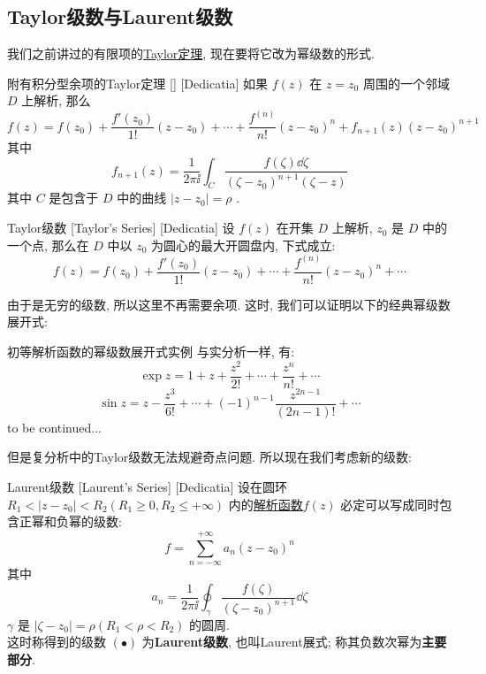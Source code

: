 \documentclass[UTF8]{ctexart}
\newcommand{\continued}{{\Large to be continued...}}
\newcommand{\AnalyticalFunction}{\hyperref[dfn:AnalyticalFunction]{解析函数}}
\newcommand{\TaylorThm}{\hyperref[thm:Taylor]{Taylor定理}}
\begin{document}
\subsection{Taylor级数与Laurent级数}
我们之前讲过的有限项的\TaylorThm , 现在要将它改为幂级数的形式. 
\begin{thm}
    [UUID]
    {附有积分型余项的Taylor定理}
    []
    [Dedicatia]
    如果 \( f(z) \) 在 \( z=z_0 \) 周围的一个邻域 \( D \) 上解析, 那么
    \[f(z)=f(z_0)+\frac{f'(z_0)}{1!}(z-z_0)+\cdots+\frac{f^{(n)}}{n!}(z-z_0)^n+f_{n+1}(z)(z-z_0)^{n+1}\]
    其中
    \[f_{n+1}(z)=\frac{1}{2\pi\ii}\int_C\frac{f(\zeta)\dd{\zeta}}{(\zeta-z_0)^{n+1}(\zeta-z)}\]
    其中 \( C \) 是包含于 \( D \) 中的曲线 \( |z-z_0|=\rho \) . 
\end{thm}
\begin{thm}
    [TaylorSeries]
    {Taylor级数}
    [Taylor's Series]
    [Dedicatia]
    设 \( f(z) \) 在开集 \( D \) 上解析,  \( z_0 \) 是 \( D \) 中的一个点, 那么在 \( D \) 中以 \( z_0 \) 为圆心的最大开圆盘内, 下式成立: 
    \[f(z)=f(z_0)+\frac{f'(z_0)}{1!}(z-z_0)+\cdots+\frac{f^{(n)}}{n!}(z-z_0)^n+\cdots\]
\end{thm}
由于是无穷的级数, 所以这里不再需要余项. 这时, 我们可以证明以下的经典幂级数展开式: 
\begin{xmp}
    {初等解析函数的幂级数展开式实例\label{xmp:TaylorCommon}}
    与实分析一样, 有: 
    \[\exp z=1+z+\frac{z^2}{2!}+\cdots+\frac{z^n}{n!}+\cdots\]
    \[\sin z=z-\frac{z^3}{6!}+\cdots+(-1)^{n-1}\frac{z^{2n-1}}{(2n-1)!}+\cdots\]
    \continued
\end{xmp}
但是复分析中的Taylor级数无法规避奇点问题. 所以现在我们考虑新的级数: 
\begin{thm}
    [Laurent]
    {Laurent级数}
    [Laurent's Series]
    [Dedicatia]
    设在圆环 \( R_1<|z-z_0|<R_2(R_1\geqslant 0, R_2\leqslant+\infty ) \) 内的\AnalyticalFunction  \( f(z) \) 必定可以写成同时包含正幂和负幂的级数: 
    \[f=\sum_{n=-\infty}^{+\infty}a_n(z-z_0)^n\tag{ \( \bullet \) }\]
    其中
    \[a_n=\frac{1}{2\pi\ii}\oint_{\gamma}\frac{f(\zeta)}{(\zeta-z_0)^{n+1}}\dd{\zeta}\]
    \( \gamma \) 是 \( |\zeta-z_0|=\rho(R_1<\rho< R_2) \) 的圆周. \\
    这时称得到的级数 \( (\bullet) \) 为\textbf{Laurent级数}, 也叫Laurent展式; 称其负数次幂为\textbf{主要部分}. 
\end{thm}
\end{document}
